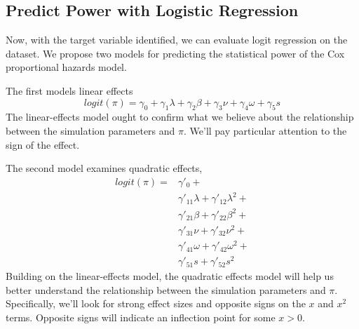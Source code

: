 \subsection{Predict Power with Logistic Regression}

Now, with the target variable identified, we can evaluate logit regression on the dataset. We propose two models for predicting the statistical power of the Cox proportional hazards model. 

The first models linear effects
%
\begin{equation}
    logit(\pi)  = \gamma_{0} + 
        \gamma_{1} \lambda + 
        \gamma_{2} \beta + 
        \gamma_{3} \nu +
        \gamma_{4} \omega +
        \gamma_{5} s
\end{equation}
%
The linear-effects model ought to confirm what we believe about the relationship between the simulation parameters and $\pi$. We'll pay particular attention to the sign of the effect. 

The second model examines quadratic effects,
%
\begin{equation}
\begin{aligned}
    logit(\pi) = & \gamma'_{0} + \\ &
        \gamma'_{11} \lambda + 
        \gamma'_{12} \lambda^2 +  \\ &
        \gamma'_{21} \beta +
        \gamma'_{22} \beta^2 + \\ &
        \gamma'_{31} \nu + 
        \gamma'_{32} \nu^2 +  \\ &
        \gamma'_{41} \omega +
        \gamma'_{42} \omega^2 + \\ &
        \gamma'_{51} s +
        \gamma'_{52} s^2
\end{aligned}
\end{equation}
%
Building on the linear-effects model, the quadratic effects model will help us better understand the relationship between the simulation parameters and $\pi$. Specifically, we'll look for strong effect sizes and opposite signs on the $x$ and $x^2$ terms. Opposite signs will indicate an inflection point for some $x > 0$. 

